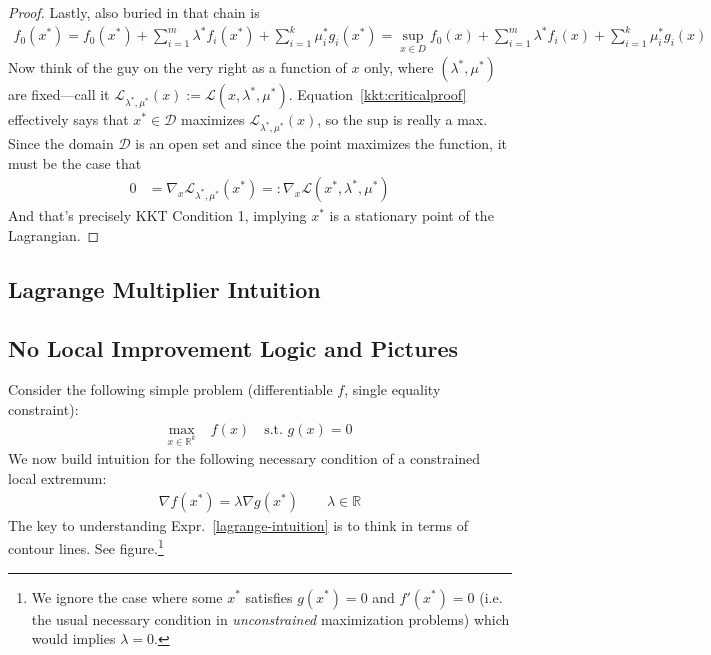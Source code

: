 \documentclass[12pt]{article}
\numberwithin{equation}{section} %
\theoremstyle{plain}
\theoremstyle{definition}
\theoremstyle{remark}
\newcommand{\sL}{\mathscr{L}}
\newcommand{\R}{\mathbb{R}}
\begin{document}
\begin{proof}
Lastly, also buried in that chain is
\begin{align}
  f_0(x^*)
  = f_0(x^*) + \sum^m_{i=1} \lambda^* f_i(x^*)
  + \sum^k_{i=1} \mu_i^* g_i(x^*)
  = \sup_{x\in D} f_0(x) + \sum^m_{i=1} \lambda^* f_i(x)
  + \sum^k_{i=1} \mu_i^* g_i(x)
  \label{kkt:criticalproof}
\end{align}
Now think of the guy on the very right as a function of $x$ only, where
$(\lambda^*,\mu^*)$ are fixed---call it
$\sL_{\lambda^*,\mu^*}(x):=\sL(x,\lambda^*,\mu^*)$.
Equation~\ref{kkt:criticalproof} effectively says that
$x^*\in\mathcal{D}$ maximizes $\sL_{\lambda^*,\mu^*}(x)$, so the sup is
really a max. Since the domain $\mathcal{D}$ is an open set and since
the point maximizes the function, it must be the case that
\begin{align*}
  0 &= \nabla_x \sL_{\lambda^*,\mu^*}(x^*)
  =:
  \nabla_x \sL(x^*,\lambda^*,\mu^*)
\end{align*}
And that's precisely KKT Condition 1, implying $x^*$ is a stationary
point of the Lagrangian.
\end{proof}

\clearpage
\subsection{Lagrange Multiplier Intuition}

\subsection{No Local Improvement Logic and Pictures}

Consider the following simple problem (differentiable $f$, single
equality constraint):
\begin{align}
  \max_{x\in\R^k} &\;f(x)
  \quad
  \text{s.t. } g(x) = 0
  \label{prob:eqconst}
\end{align}
We now build intuition for the following necessary condition of a
constrained local extremum:
\begin{align}
  \nabla f(x^*) = \lambda \nabla g(x^*)
  \qquad \lambda \in \R
  \label{lagrange-intuition}
\end{align}
The key to understanding Expr.~\ref{lagrange-intuition} is
to think in terms of contour lines. See figure.\footnote{%
  We ignore the case where some $x^*$ satisfies $g(x^*)=0$ and
  $f'(x^*)=0$ (i.e. the usual necessary condition in
  \emph{unconstrained} maximization problems) which would implies
  $\lambda=0$.
}
\end{document}
